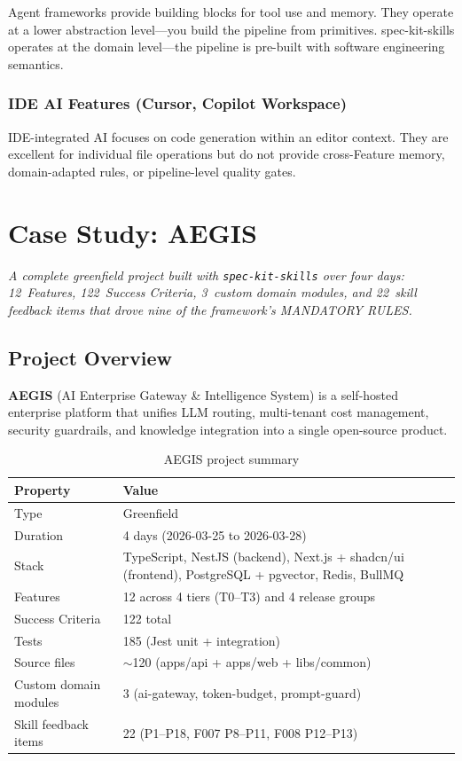 \documentclass[11pt,a4paper,openright,twoside]{report}
\newcommand{\speckit}{\texttt{spec-kit-skills}}
\begin{document}
Agent frameworks provide building blocks for tool use and memory. They operate at a lower abstraction level---you build the pipeline from primitives. spec-kit-skills operates at the domain level---the pipeline is pre-built with software engineering semantics.

\subsection{IDE AI Features (Cursor, Copilot Workspace)}

IDE-integrated AI focuses on code generation within an editor context. They are excellent for individual file operations but do not provide cross-Feature memory, domain-adapted rules, or pipeline-level quality gates.


\chapter{Case Study: AEGIS}
\label{ch:case-study}

\textit{A complete greenfield project built with \speckit{} over four days: 12~Features, 122~Success Criteria, 3~custom domain modules, and 22~skill feedback items that drove nine of the framework's MANDATORY RULES.}

\section{Project Overview}

\textbf{AEGIS} (AI Enterprise Gateway \& Intelligence System) is a self-hosted enterprise platform that unifies LLM routing, multi-tenant cost management, security guardrails, and knowledge integration into a single open-source product.

\begin{table}[H]
\centering
\caption{AEGIS project summary}
\label{tab:aegis-summary}
\begin{tabularx}{\textwidth}{lX}
\toprule
\textbf{Property} & \textbf{Value} \\
\midrule
Type & Greenfield \\
Duration & 4 days (2026-03-25 to 2026-03-28) \\
Stack & TypeScript, NestJS (backend), Next.js + shadcn/ui (frontend), PostgreSQL + pgvector, Redis, BullMQ \\
Features & 12 across 4 tiers (T0--T3) and 4 release groups \\
Success Criteria & 122 total \\
Tests & 185 (Jest unit + integration) \\
Source files & $\sim$120 (apps/api + apps/web + libs/common) \\
Custom domain modules & 3 (ai-gateway, token-budget, prompt-guard) \\
Skill feedback items & 22 (P1--P18, F007 P8--P11, F008 P12--P13) \\
\bottomrule
\end{tabularx}
\end{table}
\end{document}
